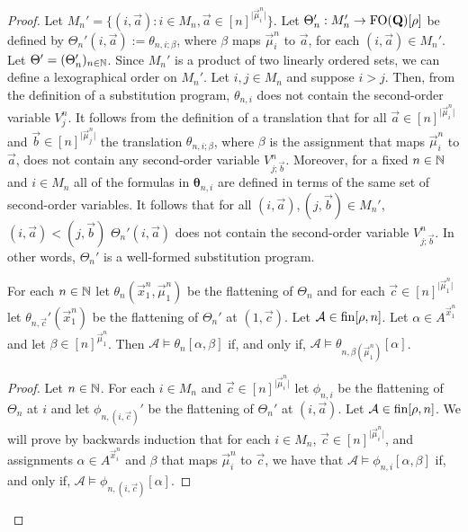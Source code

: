 \documentclass[../main/thesis.tex]{subfiles}
\begin{document}
\begin{proof}
  Let $M_n' = \{(i, \vec{a}) : i \in M_n, \vec{a} \in [n]^{\vert \vec{\mu}^n_i
    \vert}\}$. Let $\Theta_n' : M_n' \rightarrow \text{\upshape FO}(\mathbf{Q})[\rho]$ be defined by
  $\Theta_n' (i, \vec{a}) := \theta_{n, i; \beta}$, where $\beta$ maps
  $\vec{\mu}^n_i$ to $\vec{a}$, for each $(i, \vec{a}) \in M_n'$. Let $\Theta' =
  (\Theta_n')_{n \in \mathbb{N}}$. Since $M_n'$ is a product of two linearly ordered
  sets, we can define a lexographical order on $M_n'$. Let $i, j \in M_n$ and
  suppose $i > j$. Then, from the definition of a substitution program,
  $\theta_{n, i}$ does not contain the second-order variable $V^n_{j}$. It
  follows from the definition of a translation that for all $\vec{a} \in
  [n]^{\vert \vec{\mu}^n_i \vert}$ and $\vec{b} \in [n]^{\vert \vec{\mu}^n_j
    \vert}$ the translation $\theta_{n, i ; \beta}$, where $\beta$ is the
  assignment that maps $\vec{\mu}^n_i$ to $\vec{a}$, does not contain any
  second-order variable $V^n_{j ; \vec{b}}$. Moreover, for a fixed $n \in \mathbb{N}$
  and $i \in M_n$ all of the formulas in $\boldsymbol{\theta}_{n, i}$ are
  defined in terms of the same set of second-order variables. It follows that
  for all $(i, \vec{a}), (j, \vec{b}) \in M_n'$, $(i, \vec{a}) < (j, \vec{b})$
  $\Theta_n'(i, \vec{a})$ does not contain the second-order variable $V^n_{j;
    \vec{b}}$. In other words, $\Theta_n'$ is a well-formed substitution
  program.

  \begin{claim}
    For each $n \in \mathbb{N}$ let $\theta_n(\vec{x}^n_1, \vec{\mu}^n_1)$ be the
    flattening of $\Theta_n$ and for each $\vec{c} \in [n]^{\vert
      \vec{\mu}^n_1\vert}$ let $\theta_{n, \vec{c}}'(\vec{x}^n_1)$ be the
    flattening of $\Theta_n'$ at $(1, \vec{c})$. Let $\mathcal{A} \in \text{\upshape fin}[\rho,
    n]$. Let $\alpha \in A^{\vec{x}^n_1}$ and let $\beta \in
    [n]^{\vec{\mu}^n_1}$. Then $\mathcal{A} \models \theta_n [\alpha, \beta]$
    if, and only if, $\mathcal{A} \models \theta_{n,
      \beta(\vec{\mu}^n_1)}[\alpha]$.
  \end{claim}
  \begin{proof}
    Let $n \in \mathbb{N}$. For each $i \in M_n$ and $\vec{c} \in [n]^{\vert
      \vec{\mu}^n_i\vert}$ let $\phi_{n, i}$ be the flattening of $\Theta_n$ at
    $i$ and let $\phi_{n, (i, \vec{c})}'$ be the flattening of $\Theta_n'$ at
    $(i, \vec{a})$. Let $\mathcal{A} \in \text{\upshape fin}[\rho, n]$. We will prove by
    backwards induction that for each $i \in M_n$, $\vec{c} \in [n]^{\vert
      \vec{\mu}^n_i\vert}$, and assignments $\alpha \in A^{\vec{x}^n_i}$ and
    $\beta$ that maps $\vec{\mu}^n_i$ to $\vec{c}$, we have that $\mathcal{A}
    \models \phi_{n, i}[\alpha, \beta]$ if, and only if, $\mathcal{A} \models
    \phi_{n, (i, \vec{c})}[\alpha]$.


\end{proof}
\end{proof}
\end{document}
